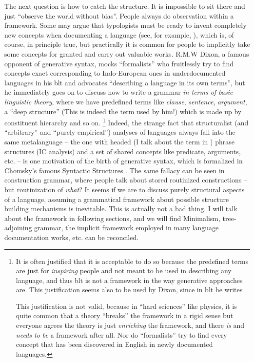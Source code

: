 \documentclass[../main.tex]{subfiles}
\begin{document}
The next question is how to catch the structure. It is impossible to sit there and just ``observe the world without bias''. People always do observation within a 
framework. Some may argue that typologists must be ready to invent completely new concepts when documenting 
a language (see, for example, \citet{haspelmath2008framework}), which is, of course, in principle true, 
but practically it is common for people to implicitly take some concepts for granted and carry out 
valuable works. R.M.W Dixon, a famous opponent of generative syntax, mocks ``formalists'' who fruitlessly try 
to find concepts exact corresponding to Indo-European ones in underdocumented languages in his 
\ac{blt} \citep{dixon2009basic} and advocates ``describing a language in its own terms'',
but he immediately goes on to discuss how to write a grammar \emph{in terms of basic linguistic theory},
where we have predefined terms like \emph{clause}, \emph{sentence}, \emph{argument}, a ``deep structure''
(This is indeed the term used by him!) which is made up by constituent hierarchy and so on.%
\footnote{
    It is often justified that it is acceptable to do so because the predefined terms are just for \emph{inspiring} 
    people and not meant to be used in describing any language, and thus \ac{blt} is not a framework in the way generative approaches are. This justification seems also to be used by Dixon, since in \ac{blt} he writes 
    
    This justification is not valid, because in 
    ``hard sciences'' like physics, it is quite common that a theory ``breaks'' the framework in a rigid sense 
    but everyone agrees the theory is just \emph{enriching} the framework, and there \emph{is} and 
    \emph{needs to be} a framework after all. Nor do ``formalists'' try to find every concept that has been discovered in English in newly documented 
    languages. %
}
Indeed, the strange fact that structuralist (and ``arbitrary'' and ``purely empirical'') analyses of 
languages always fall into the same metalanguage -- the one with headed (I talk about the term in 
) phrase structures (IC analysis) and a set of shared concepts like predicate, 
arguments, etc. -- is one motivation of the birth of generative syntax, which is formalized in Chomsky's 
famous Syntactic Structures \citep{chomsky2009syntactic}. The same fallacy can be seen in construction grammar,
where people talk about stored routinized constructions -- but routinization of \emph{what}? 
It seems if we are to discuss purely structural aspects of a language, assuming a grammatical framework 
about possible structure building mechanisms is inevitable. This is actually not a bad thing. I will 
talk about the framework in following sections, and we will find Minimalism, tree-adjoining
grammar, the implicit framework employed in many language documentation works, etc. can be reconciled.
\end{document}
